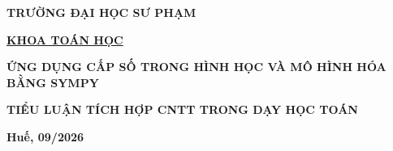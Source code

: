 \documentclass[12pt,a4paper,oneside]{book}
\theoremstyle{theorem}
\theoremstyle{definition}
\begin{document}
	
	
	\fontsize{13pt}{18pt}\selectfont %
	\setlength{\baselineskip}{26truept}
	\pagestyle{empty}
	
	
	\begin{titlepage}
		\centerline{ \bf TRƯỜNG ĐẠI HỌC SƯ PHẠM}
		\centerline{\bf\underline{KHOA TOÁN HỌC}}
		\vspace*{3.0cm}
		\vspace*{3cm}
		\begin{center}
			\fontsize{18pt}{17pt}\selectfont 
			\bf\fontsize{17pt}{19}\selectfont ỨNG DỤNG CẤP SỐ TRONG HÌNH HỌC VÀ MÔ HÌNH HÓA BẰNG SYMPY
		\end{center}	
		\vspace*{1cm}
		
		\vspace*{2.5cm}
		
		\centerline{\bf\fontsize{15pt}{16}\selectfont  TIỂU LUẬN TÍCH HỢP CNTT TRONG DẠY HỌC TOÁN}
		\vspace*{1cm}
		
		\centerline{\bf\fontsize{14pt}{16}\selectfont {TS NGUYỄN ĐĂNG MINH PHÚC}}
		
		\vfill
		
		\centerline{\bf Huế, 09/2026}
	\end{titlepage}
	\newpage
	\newpage
	
	
	
	\newpage
	\newpage
	\def\@chapter[#1]#2{\ifnum \c@secnumdepth >\m@ne
		\if@mainmatter
		\refstepcounter{chapter}%
		\typeout{\@chapapp\space\thechapter.}%
		\addcontentsline{toc}{chapter}%
		{\bf  Chương \protect\numberline{\thechapter. } #1}%
		\else
		\addcontentsline{toc}{chapter}{ #1}%
		\fi
		\else
		\addcontentsline{toc}{chapter}{ #1}%
		\fi
		\chaptermark{#1}%
		\addtocontents{lof}{\protect\addvspace{10\p@}}%
		\addtocontents{lot}{\protect\addvspace{10\p@}}%
		\if@twocolumn
		\@topnewpage[\@makechapterhead{#2}]%
		\else
		\@makechapterhead{#2}%
		\@afterheading
		\fi}
	\tableofcontents
	\pagestyle{plain}
	
\end{document}
